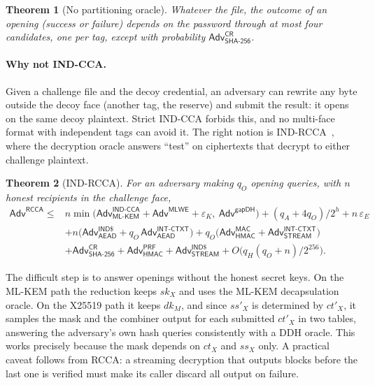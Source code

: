 \documentclass[11pt,a4paper]{article}
\newtheorem{theorem}{Theorem}
\theoremstyle{definition}
\theoremstyle{remark}
\newcommand{\Adv}{\mathsf{Adv}}
\newcommand{\HMAC}{\mathsf{HMAC}}
\newcommand{\AEAD}{\mathsf{AEAD}}
\begin{document}
\begin{theorem}[No partitioning oracle]
Whatever the file, the outcome of an opening (success or failure) depends on the password through at most four candidates, one per tag, except with probability $\Adv^{\mathsf{CR}}_{\mathsf{SHA\text{-}256}}$.
\end{theorem}

\paragraph{Why not IND-CCA.} Given a challenge file and the decoy credential, an adversary can rewrite any byte outside the decoy face (another tag, the reserve) and submit the result: it opens on the same decoy plaintext. Strict IND-CCA forbids this, and no multi-face format with independent tags can avoid it. The right notion is IND-RCCA~\cite{rcca}, where the decryption oracle answers ``test'' on ciphertexts that decrypt to either challenge plaintext.

\begin{theorem}[IND-RCCA]
\label{thm:rcca}
For an adversary making $q_O$ opening queries, with $n$ honest recipients in the challenge face,
\begin{align*}
\Adv^{\mathsf{RCCA}} \le{}& n\min\!\big(\Adv^{\mathsf{IND\text{-}CCA}}_{\mathsf{ML\text{-}KEM}} + \Adv^{\mathsf{MLWE}} + \varepsilon_K,\ \Adv^{\mathsf{gapDH}}\big) + (q_A + 4q_O)/2^h + n\,\varepsilon_E \\
&+ n\big(\Adv^{\mathsf{IND\$}}_{\AEAD} + q_O\,\Adv^{\mathsf{INT\text{-}CTXT}}_{\AEAD}\big) + q_O\big(\Adv^{\mathsf{MAC}}_{\HMAC} + \Adv^{\mathsf{INT\text{-}CTXT}}_{\mathsf{STREAM}}\big) \\
&+ \Adv^{\mathsf{CR}}_{\mathsf{SHA\text{-}256}} + \Adv^{\mathsf{PRF}}_{\HMAC} + \Adv^{\mathsf{IND\$}}_{\mathsf{STREAM}} + O\big(q_H(q_O+n)/2^{256}\big).
\end{align*}
\end{theorem}

The difficult step is to answer openings without the honest secret keys. On the ML-KEM path the reduction keeps $sk_X$ and uses the ML-KEM decapsulation oracle. On the X25519 path it keeps $dk_M$, and since $ss'_X$ is determined by $ct'_X$, it samples the mask and the combiner output for each submitted $ct'_X$ in two tables, answering the adversary's own hash queries consistently with a DDH oracle. This works precisely because the mask depends on $ct_X$ and $ss_X$ only. A practical caveat follows from RCCA: a streaming decryption that outputs blocks before the last one is verified must make its caller discard all output on failure.
\end{document}
